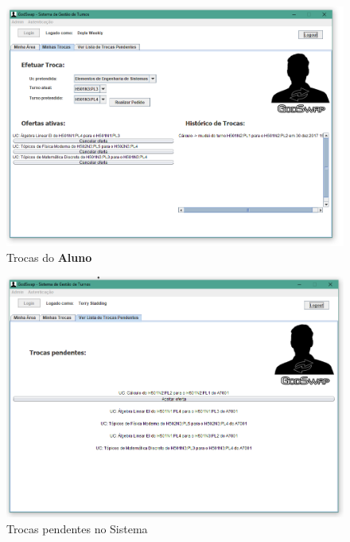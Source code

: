 \documentclass[a4paper]{article}
\begin{document}
\begin{figure}[H]
\centering
\includegraphics[width=13.5cm]{IminhastrocasALUNO}
\caption{Trocas do \textbf{Aluno}}
\label{}
\end{figure}

\begin{figure}[H]
\centering
\includegraphics[width=13.5cm]{ItrocaspendentesALUNO}
\caption{Trocas pendentes no Sistema}
\label{}
\end{figure}
\end{document}
